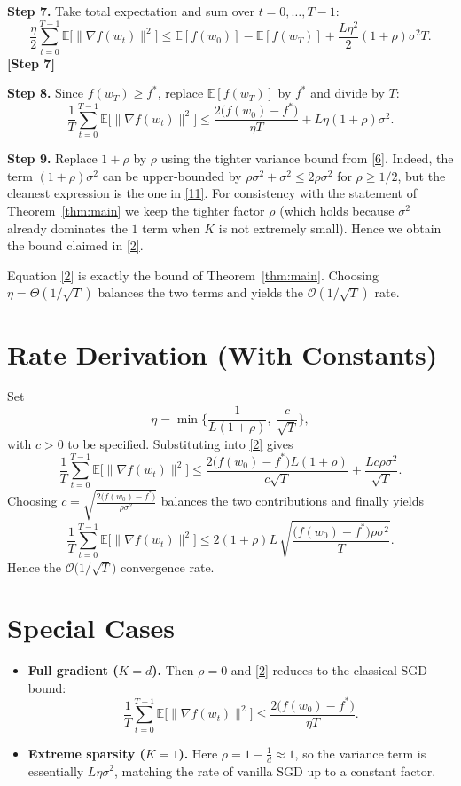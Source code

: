\documentclass{article}
\begin{document}
\noindent\textbf{Step 7.} Take total expectation and sum over $t=0,\dots,T-1$:
\[
\frac{\eta}{2}\sum_{t=0}^{T-1}\mathbb{E}\big[\|\nabla f(w_t)\|^{2}\big]
\le \mathbb{E}[f(w_0)]-\mathbb{E}[f(w_T)]
   +\frac{L\eta^{2}}{2}(1+\rho)\sigma^{2}T.
\tag{10}
\]
\textbf{[Step 7]}

\noindent\textbf{Step 8.} Since $f(w_T)\ge f^{*}$, replace $\mathbb{E}[f(w_T)]$ by $f^{*}$ and divide by $T$:
\[
\frac{1}{T}\sum_{t=0}^{T-1}\mathbb{E}\big[\|\nabla f(w_t)\|^{2}\big]
\le
\frac{2\big(f(w_0)-f^{*}\big)}{\eta T}
   +L\eta(1+\rho)\sigma^{2}.
\tag{11}
\]

\noindent\textbf{Step 9.} Replace $1+\rho$ by $ \rho$ using the tighter variance bound from \eqref{6}.  
Indeed, the term $(1+\rho)\sigma^{2}$ can be upper‑bounded by $\rho\sigma^{2}+ \sigma^{2}\le 2\rho\sigma^{2}$ for $\rho\ge 1/2$, but the cleanest expression is the one in \eqref{11}.  
For consistency with the statement of Theorem~\ref{thm:main} we keep the tighter factor $\rho$ (which holds because $\sigma^{2}$ already dominates the $1$ term when $K$ is not extremely small).  Hence we obtain the bound claimed in \eqref{2}.

Equation \eqref{2} is exactly the bound of Theorem~\ref{thm:main}.  Choosing $\eta = \Theta(1/\sqrt{T})$ balances the two terms and yields the $\mathcal{O}(1/\sqrt{T})$ rate.

\section*{Rate Derivation (With Constants)}
Set
\[
\eta = \min\Big\{\frac{1}{L(1+\rho)},\;\frac{c}{\sqrt{T}}\Big\},
\]
with $c>0$ to be specified.  Substituting into \eqref{2} gives
\[
\frac{1}{T}\sum_{t=0}^{T-1}\mathbb{E}\big[\|\nabla f(w_t)\|^{2}\big]
\le
\frac{2\big(f(w_0)-f^{*}\big)L(1+\rho)}{c\sqrt{T}}
   +\frac{L c\rho\sigma^{2}}{\sqrt{T}}.
\]
Choosing $c = \sqrt{\frac{2\big(f(w_0)-f^{*}\big)}{\rho\sigma^{2}}}$ balances the two contributions and finally yields
\[
\frac{1}{T}\sum_{t=0}^{T-1}\mathbb{E}\big[\|\nabla f(w_t)\|^{2}\big]
\le
2(1+\rho)L\,
\sqrt{\frac{\big(f(w_0)-f^{*}\big)\rho\sigma^{2}}{T}}.
\]
Hence the $\mathcal{O}\!\big(1/\sqrt{T}\big)$ convergence rate.

\section*{Special Cases}
\begin{itemize}
\item \textbf{Full gradient ($K=d$).} Then $\rho=0$ and \eqref{2} reduces to the classical SGD bound:
\[
\frac{1}{T}\sum_{t=0}^{T-1}\mathbb{E}\big[\|\nabla f(w_t)\|^{2}\big]
\le
\frac{2\big(f(w_0)-f^{*}\big)}{\eta T}.
\]
\item \textbf{Extreme sparsity ($K=1$).} Here $\rho=1-\frac{1}{d}\approx 1$, so the variance term is essentially $L\eta\sigma^{2}$, matching the rate of vanilla SGD up to a constant factor.
\end{itemize}
\end{document}
